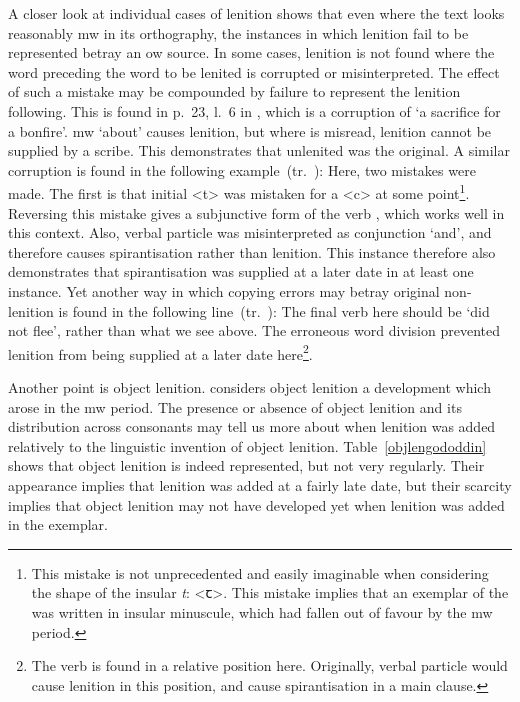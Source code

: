 A closer look at individual cases of lenition shows that even where the text looks reasonably \gls{mw} in its orthography, the instances in which lenition fail to be represented  betray an \gls{ow} source. In some cases, lenition is not found where the word preceding the word to be lenited is corrupted or misinterpreted. The effect of such a mistake may be compounded by failure to represent the lenition following. This is found in p.\ 23, l.\ 6 in , which is a corruption of  `a sacrifice for a bonfire'. \gls{mw}  `about' causes lenition, but where  is misread, lenition cannot be supplied by a scribe. This demonstrates that unlenited  was the original. A similar corruption is found in the following example~(tr.\ \textcite[30]{jarman_y_1988}):
Here, two mistakes were made. The first is that initial <t> was mistaken for a <c> at some point\footnote{This mistake is not unprecedented and easily imaginable when considering the shape of the insular \emph{t}: <ꞇ>. This mistake implies that an exemplar of the  was written in insular minuscule, which had fallen out of favour by the \gls{mw} period.}. Reversing this mistake gives a subjunctive form of the verb , which works well in this context. Also, verbal particle  was misinterpreted as conjunction  `and', and therefore causes spirantisation rather than lenition. This instance therefore also demonstrates that spirantisation was supplied at a later date in at least one instance. Yet another way in which copying errors may betray original non-lenition is found in the following line~(tr.\ \textcite[4]{jarman_y_1988}):
The final verb here should be  `did not flee', rather than what we see above. The erroneous word division prevented lenition from being supplied at a later date here\footnote{The verb  is found in a relative position here. Originally, verbal particle  would cause lenition in this position, and cause spirantisation in a main clause.}.

Another point is object lenition. \Textcite{van_sluis_development_2014} considers object lenition a development which arose in the \gls{mw} period. The presence or absence of object lenition and its distribution across consonants may tell us more about when lenition was added relatively to the linguistic invention of object lenition. Table~\ref{objlengododdin} shows that object lenition is indeed represented, but not very regularly. Their appearance implies that lenition was added at a fairly late date, but their scarcity implies that object lenition may not have developed yet when lenition was added in the exemplar.

